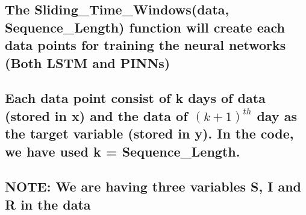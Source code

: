 \documentclass[11pt]{article}
\begin{document}
    \hypertarget{the-sliding_time_windowsdata-sequence_length-function-will-create-each-data-points-for-training-the-neural-networks-both-lstm-and-pinns}{%
\subsection{The Sliding\_Time\_Windows(data, Sequence\_Length) function
will create each data points for training the neural networks (Both LSTM
and
PINNs)}\label{the-sliding_time_windowsdata-sequence_length-function-will-create-each-data-points-for-training-the-neural-networks-both-lstm-and-pinns}}

    \hypertarget{each-data-point-consist-of-k-days-of-data-stored-in-x-and-the-data-of-k1th-day-as-the-target-variable-stored-in-y.-in-the-code-we-have-used-k-sequence_length.}{%
\subsection{\texorpdfstring{Each data point consist of k days of data
(stored in x) and the data of \((k+1)^{th}\) day as the target variable
(stored in y). In the code, we have used k =
Sequence\_Length.}{Each data point consist of k days of data (stored in x) and the data of (k+1)\^{}\{th\} day as the target variable (stored in y). In the code, we have used k = Sequence\_Length.}}\label{each-data-point-consist-of-k-days-of-data-stored-in-x-and-the-data-of-k1th-day-as-the-target-variable-stored-in-y.-in-the-code-we-have-used-k-sequence_length.}}

\hypertarget{note-we-are-having-three-variables-s-i-and-r-in-the-data}{%
\subsection{NOTE: We are having three variables S, I and R in the
data}\label{note-we-are-having-three-variables-s-i-and-r-in-the-data}}
\end{document}
